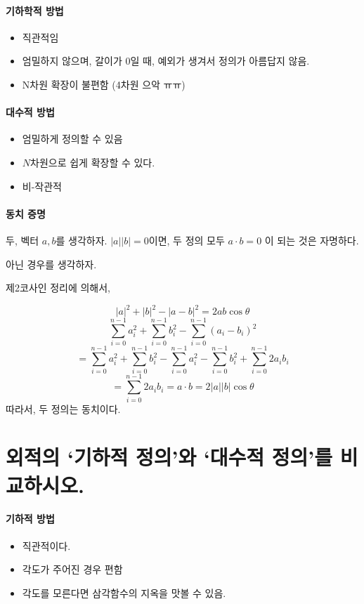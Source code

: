 \paragraph{기하학적 방법}
\begin{itemize}
    \item 직관적임
    \item 엄밀하지 않으며, 갈이가 $0$일 때, 예외가 생겨서 정의가 아름답지 않음.
    \item N차원 확장이 불편함 (4차원 으악 ㅠㅠ)
    
\end{itemize}

\paragraph{대수적 방법}
\begin{itemize}
    \item 엄밀하게 정의할 수 있음
    \item $N$차원으로 쉽게 확장할 수 있다.
    \item 비-작관적
\end{itemize}
	
	
\paragraph{동치 증명}

두, 벡터 $a, b$를 생각하자.
$\left|a\right|\left|b\right|=0$이면, 두 정의 모두 $a \cdot b=0$ 이 되는 것은 자명하다.

아닌 경우를 생각하자.

제2코사인 정리에 의해서, 

$$|a|^2 + |b|^2 - |a-b|^2 = 2ab \cos \theta$$
$$\sum_{i=0}^{n-1} a_i^2 + \sum_{i=0}^{n-1}b_i^2 - \sum_{i=0}^{n-1} \left(a_i-b_i\right)^2$$
$$=\sum_{i=0}^{n-1}a_i^2+\sum_{i=0}^{n-1}b_i^2-\sum_{i=0}^{n-1}a_i^2-\sum_{i=0}^{n-1}b_i^2+\sum_{i=0}^{n-1}{2a_ib_i}$$
$$=\sum_{i=0}^{n-1}{2a_ib_i}= a \cdot b =2\left|a\right|\left|b\right|\cos \theta$$
따라서, 두 정의는 동치이다.

\section{외적의 `기하적 정의'와 `대수적 정의'를 비교하시오.}

\paragraph{기하적 방법}
\begin{itemize}
    \item 직관적이다.
    \item 각도가 주어진 경우 편함
    \item 각도를 모른다면 삼각함수의 지옥을 맛볼 수 있음.
\end{itemize}


